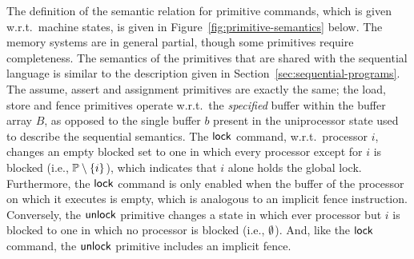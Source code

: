 \documentclass[11pt]{report}
\begin{document}
The definition of the semantic relation for primitive commands, which is given w.r.t.\ machine states, is given in Figure~\ref{fig:primitive-semantics} below. The memory systems are in general partial, though some primitives require completeness. The semantics of the primitives that are shared with the sequential language is  similar to the description given in Section~\ref{sec:sequential-programs}. The assume, assert and assignment primitives are exactly the same; the load, store and fence primitives operate w.r.t.\ the \emph{specified} buffer within the buffer array $B$, as opposed to the single buffer $b$ present in the uniprocessor state used to describe the sequential semantics. The $\operatorname{\mathsf{lock}}$ command, w.r.t.\ processor $i$, changes an empty blocked set to one in which every processor except for $i$ is blocked (i.e., $\mathbb{P} \setminus \left\lbrace i \right\rbrace$), which indicates that $i$ alone holds the global lock. Furthermore, the $\operatorname{\mathsf{lock}}$ command is only enabled when the buffer of the processor on which it executes is empty, which is analogous to an implicit fence instruction. Conversely, the $\operatorname{\mathsf{unlock}}$ primitive changes a state in which ever processor but $i$ is blocked to one in which no processor is blocked (i.e., $\operatorname{\emptyset}$). And, like the $\operatorname{\mathsf{lock}}$ command, the $\operatorname{\mathsf{unlock}}$ primitive includes an implicit fence. 
\end{document}
